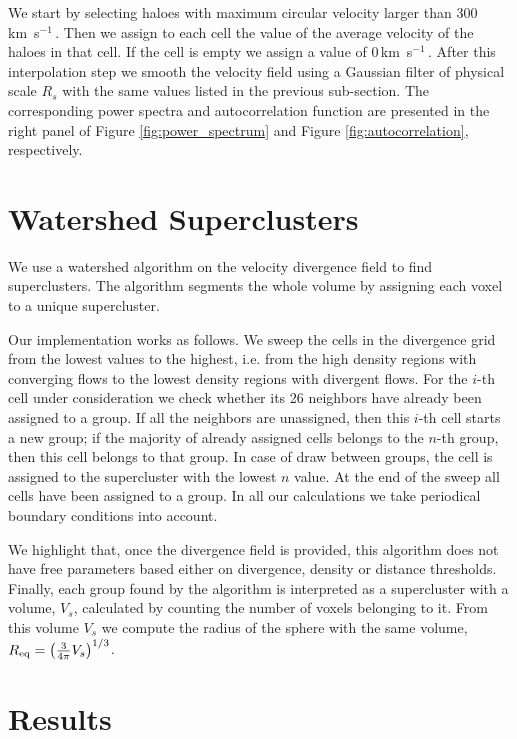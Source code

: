 \documentclass[usenatbib]{mnras}
\newcommand{\kms}{\,{\rm km}\ s$^{-1}$\,}
\begin{document}
We start by selecting haloes with maximum circular velocity larger
than $300$ \kms.
Then we assign to each cell the value of the average velocity of the haloes in that cell. 
If the cell is empty we assign a value of $0$\kms.
After this interpolation step we smooth the velocity field using a Gaussian filter of physical scale $R_s$ with the same values listed in the previous sub-section.
The corresponding power spectra and autocorrelation function are presented in the right panel of Figure \ref{fig:power_spectrum}
 and Figure \ref{fig:autocorrelation}, respectively.



\section{Watershed Superclusters}

We use a watershed algorithm \citep{BeucherWatershed1979} on the velocity divergence field to find
superclusters.
The algorithm segments the whole volume by assigning each voxel to a unique supercluster. 

Our implementation works as follows. 
We sweep the cells in the divergence grid from the lowest values to the highest, i.e. from
the high density regions with converging flows to the lowest density regions with divergent
flows.
For the $i$-th cell under consideration we check whether its 26 neighbors have already been assigned to a group. 
If all the neighbors are unassigned, then this $i$-th cell starts a
new group; if the majority of already assigned cells belongs to the
$n$-th group, then this cell belongs to that group.
In case of draw between groups, the cell is assigned to the supercluster with the lowest $n$ value.
At the end of the sweep all cells have been assigned to a group. 
In all our calculations we take periodical boundary conditions into
account.  

We highlight that, once the divergence field is provided, this algorithm
does not have free parameters based either on divergence, density or distance thresholds. 
Finally, each group found by the algorithm is interpreted as a supercluster 
with a volume, $V_s$, calculated by counting the number of voxels belonging to it.
From this volume $V_s$ we compute the radius of the sphere with the same volume, 
   $ R_{\rm eq} = \left(\frac{3}{4\pi}V_{s}\right)^{1/3}$.



\section{Results}
\end{document}
